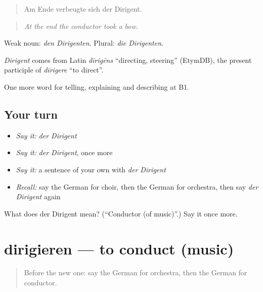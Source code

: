 \begin{quote}
Am Ende verbeugte sich der Dirigent.
\end{quote}

\begin{quote}
\emph{At the end the conductor took a bow.}
\end{quote}

Weak noun: \emph{den Dirigenten}. Plural: \emph{die Dirigenten}.

\begin{cousinweb}
\emph{Dirigent} comes from Latin \emph{dīrigēns} \textquotedblleft{}directing, steering\textquotedblright{} (EtymDB), the present participle of \emph{dīrigere} \textquotedblleft{}to direct\textquotedblright{}.
\end{cousinweb}

\begin{grammarlens}[title={What you've built}]
One more word for telling, explaining and describing at B1.
\end{grammarlens}

\subsection*{Your turn}
\begin{itemize}
\raggedright
  \item \emph{Say it:} \emph{der Dirigent}
  \item \emph{Say it:} \emph{der Dirigent}, once more
  \item \emph{Say it:} a sentence of your own with \emph{der Dirigent}
  \item \emph{Recall:} say the German for choir, then the German for orchestra, then say \emph{der Dirigent} again
\end{itemize}

\begin{tcolorbox}[breakable,colback=teal!4,colframe=teal!35!black,title={Before you move on}]
What does der Dirigent mean? (\textquotedblleft{}Conductor (of music)\textquotedblright{}.) Say it once more.
\end{tcolorbox}
\section[dirigieren]{dirigieren — to conduct (music)}

\label{lesson:GE-C515-dirigieren}



\begin{quote}
Before the new one: say the German for orchestra, then the German for conductor.
\end{quote}

